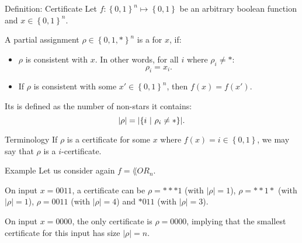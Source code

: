 \documentclass[a4paper]{article}
\begin{document}
\begin{parag}{Definition: Certificate}
    Let $f: \left\{0, 1\right\}^n \mapsto \left\{0, 1\right\}$ be an arbitrary boolean function and $x \in \left\{0, 1\right\}^n$.

    A partial assignment $\rho \in \left\{0, 1, *\right\}^n$ is a  for $x$, if:
    \begin{itemize}
        \item $\rho$ is consistent with $x$. In other words, for all $i$ where $\rho_i \neq *$: 
        \[\rho_i = x_i.\]
        \item If $\rho$ is consistent with some $x' \in \left\{0, 1\right\}^n$, then $f\left(x\right) = f\left(x'\right)$.
    \end{itemize}

    Its  is defined as the number of non-stars it contains: 
    \[\left|\rho\right| = \left|\left\{i \suchthat \rho_i \neq *\right\}\right|.\]

    \begin{subparag}{Terminology}
        If $\rho$ is a certificate for some $x$ where $f\left(x\right) = i \in \left\{0, 1\right\}$, we may say that $\rho$ is a $i$-certificate.
    \end{subparag}
\end{parag}

\begin{parag}{Example}
    Let us consider again $f = \lang{OR}_n$. 

    On input $x = 0011$, a certificate can be $\rho = ***1$ (with $\left|\rho\right| = 1$), $\rho = **1*$ (with $\left|\rho\right| = 1$), $\rho = 0011$ (with $\left|\rho\right| = 4$) and $*011$ (with $\left|\rho\right| = 3$). 

    On input $x = 0000$, the only certificate is $\rho = 0000$, implying that the smallest certificate for this input has size $\left|\rho\right| = n$.
\end{parag}
\end{document}
